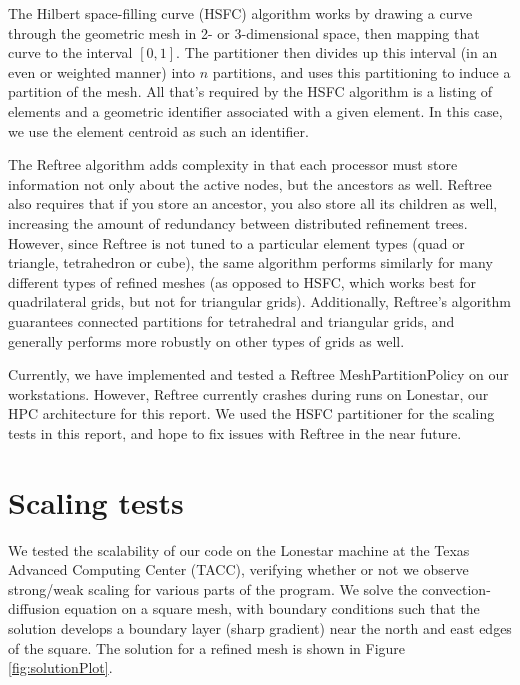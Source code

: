 \documentclass{article}
\begin{document}
The Hilbert space-filling curve (HSFC) algorithm works by drawing a curve through the geometric mesh in 2- or 3-dimensional space, then mapping that curve to the interval $[0,1]$. The partitioner then divides up this interval (in an even or weighted manner) into $n$ partitions, and uses this partitioning to induce a partition of the mesh. All that's required by the HSFC algorithm is a listing of elements and a geometric identifier associated with a given element. In this case, we use the element centroid as such an identifier. 

The Reftree algorithm \cite{REFTREE} adds complexity in that each processor must store information not only about the active nodes, but the ancestors as well. Reftree also requires that if you store an ancestor, you also store all its children as well, increasing the amount of redundancy between distributed refinement trees. However, since Reftree is not tuned to a particular element types (quad or triangle, tetrahedron or cube), the same algorithm performs similarly for many different types of refined meshes (as opposed to HSFC, which works best for quadrilateral grids, but not for triangular grids).  Additionally, Reftree's algorithm guarantees connected partitions for tetrahedral and triangular grids, and generally performs more robustly on other types of grids as well.

Currently, we have implemented and tested a Reftree MeshPartitionPolicy on our workstations. However, Reftree currently crashes during runs on Lonestar, our HPC architecture for this report. We used the HSFC partitioner for the scaling tests in this report, and hope to fix issues with Reftree in the near future. 

\section{Scaling tests}\label{sec:NumericalExperiments}

We tested the scalability of our code on the Lonestar machine at the Texas Advanced Computing Center (TACC), verifying whether or not we observe strong/weak scaling for various parts of the program.  We solve the convection-diffusion equation on a square mesh, with boundary conditions such that the solution develops a boundary layer (sharp gradient) near the north and east edges of the square.  The solution for a refined mesh is shown in Figure \ref{fig:solutionPlot}.
\end{document}
